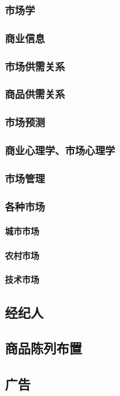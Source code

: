 \documentclass[UTF8]{../../RepresentationUniverse}
\begin{document}
        \subsubsection{市场学}
        \subsubsection{商业信息}
        \subsubsection{市场供需关系}
        \subsubsection{商品供需关系}
        \subsubsection{市场预测}
        \subsubsection{商业心理学、市场心理学}
        \subsubsection{市场管理}
        \subsubsection{各种市场}
            \paragraph{城市市场}
            \paragraph{农村市场}
            \paragraph{技术市场}
    \subsection{经纪人}
    \subsection{商品陈列布置}
    \subsection{广告}
\end{document}
